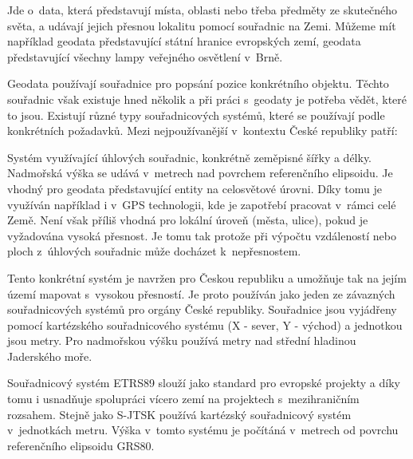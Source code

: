 Jde o~data, která představují místa, oblasti nebo třeba předměty ze skutečného světa, a udávají jejich přesnou lokalitu pomocí souřadnic na Zemi. Můžeme mít například geodata představující státní hranice evropských zemí, geodata představující všechny lampy veřejného osvětlení v~Brně.


Geodata používají souřadnice pro popsání pozice konkrétního objektu. Těchto souřadnic však existuje hned několik a při práci s~geodaty je potřeba vědět, které to jsou. Existují různé typy souřadnicových systémů, které se používají podle konkrétních požadavků. Mezi nejpoužívanější v~kontextu České republiky patří:



Systém využívající úhlových souřadnic, konkrétně zeměpisné šířky a délky. Nadmořská výška se udává v~metrech nad povrchem referenčního elipsoidu.
Je vhodný pro geodata představující entity na celosvětové úrovni. Díky tomu je využíván například i v~GPS technologii, kde je zapotřebí pracovat v~rámci celé Země.
Není však příliš vhodná pro lokální úroveň (města, ulice), pokud je vyžadována vysoká přesnost. Je tomu tak protože při výpočtu vzdáleností nebo ploch z~úhlových souřadnic může docházet k~nepřesnostem.



Tento konkrétní systém je navržen pro Českou republiku a umožňuje tak na jejím území mapovat s~vysokou přesností. Je proto používán jako jeden ze závazných souřadnicových systémů pro orgány České republiky.
Souřadnice jsou vyjádřeny pomocí kartézského souřadnicového systému (X - sever, Y - východ) a jednotkou jsou metry. Pro nadmořskou výšku používá metry nad střední hladinou Jaderského moře.


Souřadnicový systém ETRS89 slouží jako standard pro evropské projekty a díky tomu i usnadňuje spolupráci vícero zemí na projektech s~mezihraničním rozsahem.
Stejně jako S-JTSK používá kartézský souřadnicový systém v~jednotkách metru. Výška v~tomto systému je počítáná v~metrech od povrchu referenčního elipsoidu GRS80.

